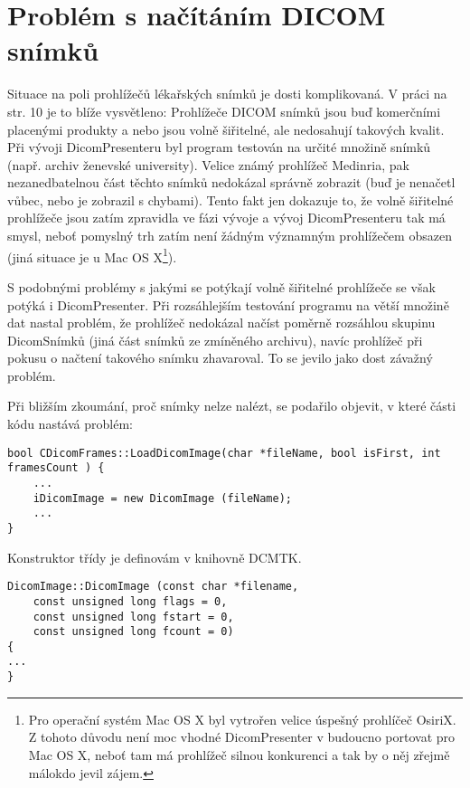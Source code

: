 \section{Problém s načítáním DICOM snímků}
Situace na poli prohlížečů lékařských snímků je dosti komplikovaná. V práci\cite{flaska} na str. 10 je to blíže vysvětleno: Prohlížeče DICOM snímků jsou buď komerčními placenými produkty a nebo jsou volně šiřitelné, ale nedosahují takových kvalit. Při vývoji DicomPresenteru byl program testován na určité množině snímků (např. archiv ženevské university). Velice známý prohlížeč Medinria, pak nezanedbatelnou část těchto snímků nedokázal správně zobrazit (buď je nenačetl vůbec, nebo je zobrazil s chybami). Tento fakt jen dokazuje to, že volně šiřitelné prohlížeče jsou zatím zpravidla ve fázi vývoje a vývoj DicomPresenteru tak má smysl, neboť pomyslný trh zatím není žádným významným prohlížečem obsazen (jiná situace je u Mac OS X\footnote{Pro operační systém Mac OS X byl vytrořen velice úspešný prohlíčeč OsiriX. Z tohoto důvodu není moc vhodné DicomPresenter v budoucno portovat pro Mac OS X, neboť tam má prohlížeč silnou konkurenci a tak by o něj zřejmě málokdo jevil zájem.}).

S podobnými problémy s jakými se potýkají volně šiřitelné prohlížeče se však potýká i DicomPresenter. Při rozsáhlejším testování programu na větší množině dat nastal problém, že prohlížeč nedokázal načíst poměrně rozsáhlou skupinu DicomSnímků (jiná část snímků ze zmíněného archivu), navíc prohlížeč při pokusu o načtení takového snímku zhavaroval. To se jevilo jako dost závažný problém.

Při bližším zkoumání, proč snímky nelze nalézt, se podařilo objevit, v které části kódu nastává problém:

\begin{lstlisting}[label=DicomImageClass,caption={Při otevírání snímku aplikace havarovala, k pádu aplikace došlo ve funkci \clist{CDicomFramed::LoadDicomImage} na uvedeném řádku (zde řádek 3).}]
bool CDicomFrames::LoadDicomImage(char *fileName, bool isFirst, int framesCount ) {
 	...
	iDicomImage = new DicomImage (fileName);
	...	
}
\end{lstlisting}

Konstruktor třídy  je definovám v knihovně DCMTK.

\begin{lstlisting}[label={DicomImage},caption={Definice konstruktoru třídy \clist{DicomImage}.}]
DicomImage::DicomImage (const char *filename,
    const unsigned long flags = 0,
    const unsigned long fstart = 0,
    const unsigned long fcount = 0)
{
...
}
\end{lstlisting}

